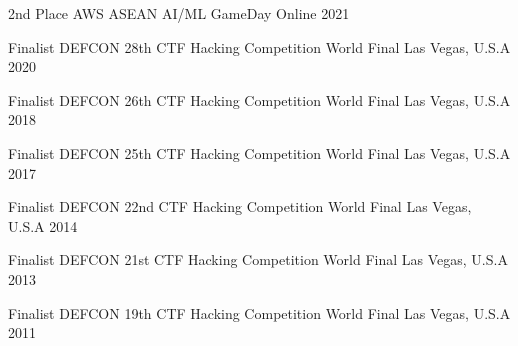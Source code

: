 \Needspace{6cm}




\begin{cvhonors}

  \cvhonor
    {2nd Place} %
    {AWS ASEAN AI/ML GameDay} %
    {Online} %
    {2021} %

  \cvhonor
    {Finalist} %
    {DEFCON 28th CTF Hacking Competition World Final} %
    {Las Vegas, U.S.A} %
    {2020} %

  \cvhonor
    {Finalist} %
    {DEFCON 26th CTF Hacking Competition World Final} %
    {Las Vegas, U.S.A} %
    {2018} %

  \cvhonor
    {Finalist} %
    {DEFCON 25th CTF Hacking Competition World Final} %
    {Las Vegas, U.S.A} %
    {2017} %

  \cvhonor
    {Finalist} %
    {DEFCON 22nd CTF Hacking Competition World Final} %
    {Las Vegas, U.S.A} %
    {2014} %

  \cvhonor
    {Finalist} %
    {DEFCON 21st CTF Hacking Competition World Final} %
    {Las Vegas, U.S.A} %
    {2013} %

  \cvhonor
    {Finalist} %
    {DEFCON 19th CTF Hacking Competition World Final} %
    {Las Vegas, U.S.A} %
    {2011} %

\end{cvhonors}


